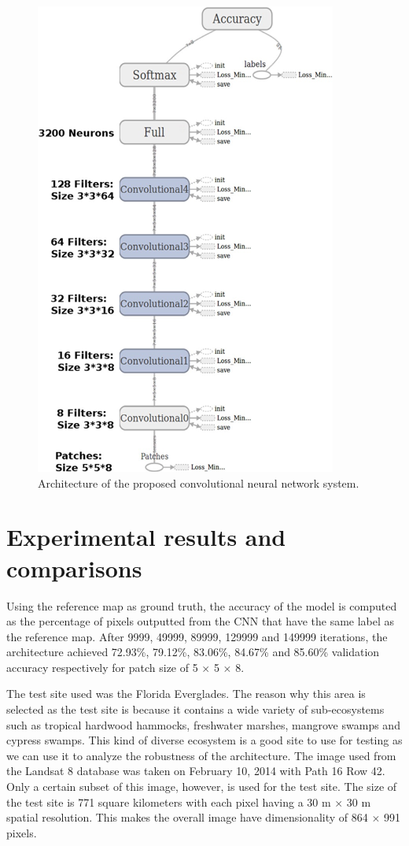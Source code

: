 \documentclass[letterpaper, 10 pt, conference]{ieeeconf}  %
\begin{document}
   \begin{figure}[thpb]
	\centering
	\includegraphics[scale=0.79]{arc.png}
	\caption{Architecture of the proposed convolutional neural network system.}
	\label{figurelabel}
\end{figure}


\section{Experimental results and comparisons}

Using the reference map as ground truth, the accuracy of the model is computed as the percentage of pixels outputted from the CNN that have the same label as the reference map. After 9999, 49999, 89999, 129999 and 149999 iterations, the architecture achieved 72.93\%, 79.12\%, 83.06\%, 84.67\% and 85.60\% validation accuracy respectively for patch size of 5 $\times$ 5 $\times$ 8.

The test site used was the Florida Everglades. The reason why this area is selected as the test site is because it contains a wide variety of sub-ecosystems such as tropical hardwood hammocks, freshwater marshes, mangrove swamps and cypress swamps. This kind of diverse ecosystem is a good site to use for testing as we can use it to analyze the robustness of the architecture. The image used from the Landsat 8 database was taken on February 10, 2014 with Path 16 Row 42. Only a certain subset of this image, however, is used for the test site. The size of the test site is 771 square kilometers with each pixel having a 30 m $\times$ 30 m spatial resolution. This makes the overall image have dimensionality of 864 $\times$ 991 pixels.
\end{document}
